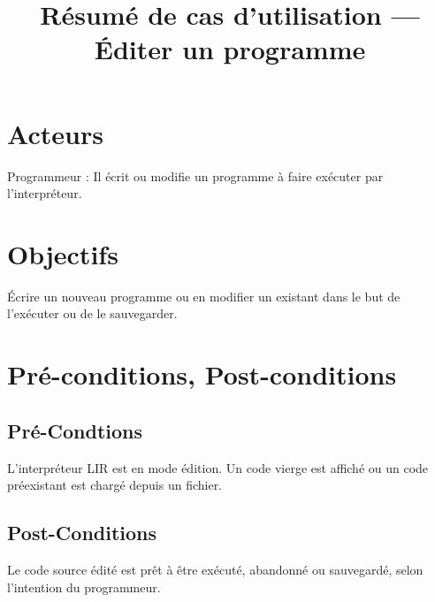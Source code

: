 \documentclass[12pt,a4paper]{article}
\title{Résumé de cas d'utilisation --- Éditer un programme} %
\date{} %
\author{} %
\begin{document}
        \maketitle

        \section{Acteurs}
            Programmeur : Il écrit ou modifie un programme à faire exécuter par
            l'interpréteur.

        \section{Objectifs}
            Écrire un nouveau programme ou en modifier un existant dans le
            but de l'exécuter ou de le sauvegarder.

        \section{Pré-conditions, Post-conditions}

            \subsection{Pré-Condtions}
                L'interpréteur LIR est en mode édition. Un code vierge est
                affiché ou un code préexistant est chargé depuis un fichier.

            \subsection{Post-Conditions}
                Le code source édité est prêt à être exécuté, abandonné ou sauvegardé,
                selon l'intention du programmeur.
\end{document}
